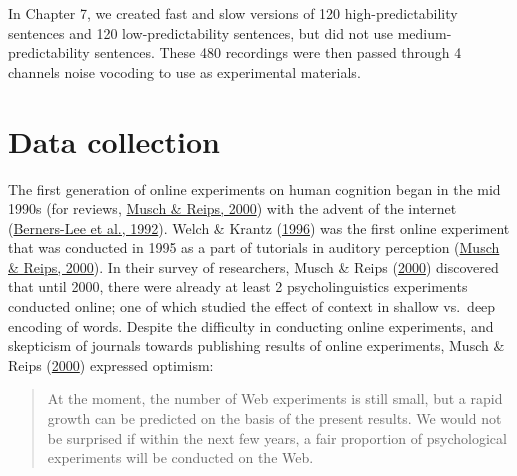 \documentclass[a4paper, nobind]{templates/ociamthesis}
\begin{document}
In Chapter 7, we created fast and slow versions of 120 high-predictability sentences and 120 low-predictability sentences, but did not use medium-predictability sentences.
These 480 recordings were then passed through 4 channels noise vocoding to use as experimental materials.

\hypertarget{data-collection}{%
\section{Data collection}\label{data-collection}}

The first generation of online experiments on human cognition began in the mid 1990s (for reviews, \protect\hyperlink{ref-Musch2000}{Musch \& Reips, 2000}) with the advent of the internet (\protect\hyperlink{ref-Bernerslee1992}{Berners-Lee et al., 1992}).
Welch \& Krantz (\protect\hyperlink{ref-Welch1996}{1996}) was the first online experiment that was conducted in 1995 as a part of tutorials in auditory perception (\protect\hyperlink{ref-Musch2000}{Musch \& Reips, 2000}).
In their survey of researchers, Musch \& Reips (\protect\hyperlink{ref-Musch2000}{2000}) discovered that until 2000, there were already at least 2 psycholinguistics experiments conducted online;
one of which studied the effect of context in shallow vs.~deep encoding of words.
Despite the difficulty in conducting online experiments, and skepticism of journals towards publishing results of online experiments,
Musch \& Reips (\protect\hyperlink{ref-Musch2000}{2000}) expressed optimism:

\begin{quote}
At the moment, the number of Web experiments is still small, but a rapid growth can be predicted on the basis of the present results.
We would not be surprised if within the next few years, a fair proportion of psychological experiments will be conducted on the Web.
\end{quote}
\end{document}

